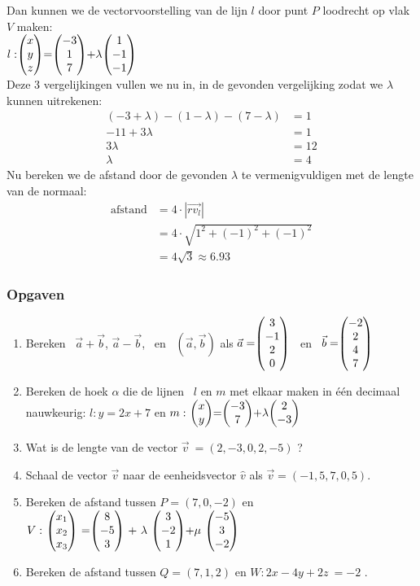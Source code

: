 Dan kunnen we de vectorvoorstelling van de lijn $l$ door punt $P$ loodrecht op vlak $V$ maken: \\
$l: \vecdrie{x}{y}{z} = \vecdrie{-3}{1}{7} + \lambda \vecdrie{1}{-1}{-1} $ \\
Deze 3 vergelijkingen vullen we nu in, in de gevonden vergelijking zodat we $\lambda$ kunnen uitrekenen:
\begin{align*}
    (-3 + \lambda) - (1-\lambda) - (7-\lambda) &= 1 \\
    -11 + 3\lambda &= 1 \\
    3\lambda &= 12 \\ 
    \lambda &= 4
\end{align*}
Nu bereken we de afstand door de gevonden $\lambda$ te vermenigvuldigen met de lengte van de normaal: 
\begin{align*}
    \text{afstand} &= 4\cdot |\overrightarrow{rv_{l}}| \\
    &= 4\cdot \sqrt{1^{2} + (-1)^{2} + (-1)^{2} } \\
    &= 4\sqrt{3} \approx 6.93
\end{align*}

\newpage
\subsubsection{Opgaven}
\begin{enumerate}
	\item  Bereken \ $ \vec{a} + \vec{b} $, \quad $ \vec{a} - \vec{b} $, \ en \ $  (\vec{a} , \vec{b}) $  als $ \vec{a} = \vecvier{3}{-1}{2}{0}  $ \  en \  $  \vec{b} =  \vecvier{-2}{2}{4}{7} $
	
	\item  Bereken de hoek $\alpha$ die de  lijnen \ $  l $ en $ m $ met elkaar maken in één decimaal nauwkeurig:
	$ l:  y = 2x +7  $ en $ m: \  \vectwee{x}{y} = \vectwee{-3}{7} + \lambda \vectwee{2}{-3}  $
	
	\item Wat is de lengte van de vector $  \vec{v} \ = (2, -3, 0, 2, -5) $ ?
	
	\item Schaal de vector $  \vec{v} $ naar de eenheidsvector $\hat{v}$
	als $  \vec{v} = (-1, 5, 7, 0, 5) $.
	
	\item Bereken de afstand tussen  $  P = (7,0,-2)  $ en 
	$ V: \ \vecdriesnel{x} \
	=  \vecdrie {8} {-5} {3}  \
	+  \ \lambda \ \vecdrie{3}{-2}{1} 
	+ \mu \  \vecdrie{-5}{3}{-2} $ 
	
	\item   Bereken de afstand tussen  $  Q = (7,1,2)  $ en 
	$ W:2x - 4y +2z \ = -2 $ .
	
\end{enumerate}

